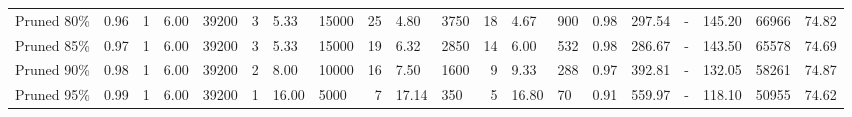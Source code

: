 \begin{table*}
{\begin{tabular}{llrllrllrllrllrlllll}
 Pruned 80\% &     0.96 &               1 &       6.00 &   39200 &                 3 &       5.33 &   15000 &                25 &       4.80 &    3750 &           18 &       4.67 &     900 & 0.98 & 297.54 &      - &  145.20 &  66966 &     74.82 \\
 Pruned 85\% &     0.97 &               1 &       6.00 &   39200 &                 3 &       5.33 &   15000 &                19 &       6.32 &    2850 &           14 &       6.00 &     532 & 0.98 & 286.67 &      - &  143.50 &  65578 &     74.69 \\
 Pruned 90\% &     0.98 &               1 &       6.00 &   39200 &                 2 &       8.00 &   10000 &                16 &       7.50 &    1600 &            9 &       9.33 &     288 & 0.97 & 392.81 &      - &  132.05 &  58261 &     74.87 \\
 Pruned 95\% &     0.99 &               1 &       6.00 &   39200 &                 1 &      16.00 &    5000 &                 7 &      17.14 &     350 &            5 &      16.80 &      70 & 0.91 & 559.97 &      - &  118.10 &  50955 &     74.62 \\
\bottomrule
\end{tabular}}
\end{table*}
